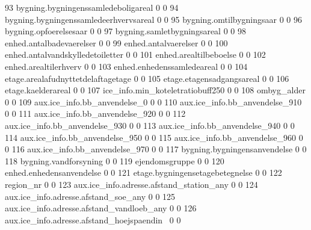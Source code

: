 \documentclass{report}
\begin{document}
\begin{Schunk}
\begin{Soutput}
 93 bygning.bygningenssamledeboligareal                      0              0   
 94 bygning.bygningenssamledeerhvervsareal                   0              0   
 95 bygning.omtilbygningsaar                                 0              0   
 96 bygning.opfoerelsesaar                                   0              0   
 97 bygning.samletbygningsareal                              0              0   
 98 enhed.antalbadevaerelser                                 0              0   
 99 enhed.antalvaerelser                                     0              0   
100 enhed.antalvandskylledetoiletter                         0              0   
101 enhed.arealtilbeboelse                                   0              0   
102 enhed.arealtilerhverv                                    0              0   
103 enhed.enhedenssamledeareal                               0              0   
104 etage.arealafudnyttetdelaftagetage                       0              0   
105 etage.etagensadgangsareal                                0              0   
106 etage.kaelderareal                                       0              0   
107 ice_info.min_koteletratiobuff250                         0              0   
108 ombyg_alder                                              0              0   
109 aux.ice_info.bb_anvendelse_0                             0              0   
110 aux.ice_info.bb_anvendelse_910                           0              0   
111 aux.ice_info.bb_anvendelse_920                           0              0   
112 aux.ice_info.bb_anvendelse_930                           0              0   
113 aux.ice_info.bb_anvendelse_940                           0              0   
114 aux.ice_info.bb_anvendelse_950                           0              0   
115 aux.ice_info.bb_anvendelse_960                           0              0   
116 aux.ice_info.bb_anvendelse_970                           0              0   
117 bygning.bygningensanvendelse                             0              0   
118 bygning.vandforsyning                                    0              0   
119 ejendomsgruppe                                           0              0   
120 enhed.enhedensanvendelse                                 0              0   
121 etage.bygningensetagebetegnelse                          0              0   
122 region_nr                                                0              0   
123 aux.ice_info.adresse.afstand_station_any                 0              0   
124 aux.ice_info.adresse.afstand_soe_any                     0              0   
125 aux.ice_info.adresse.afstand_vandloeb_any                0              0   
126 aux.ice_info.adresse.afstand_hoejspaendin~               0              0   
\end{Soutput}
\end{Schunk}
\end{document}
